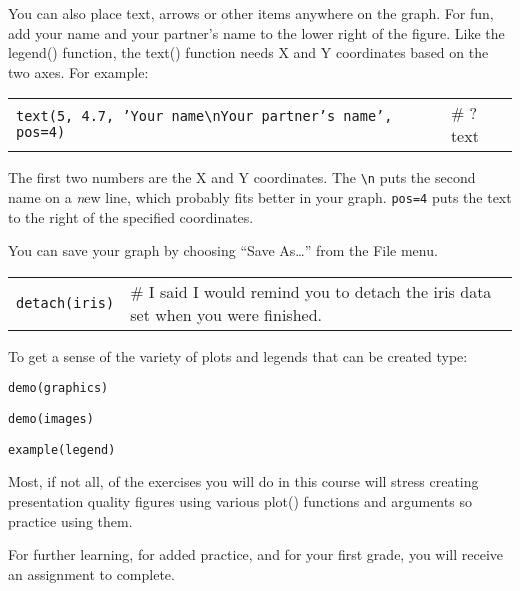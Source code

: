 \documentclass[11pt]{article}
\begin{document}



You can also place text, arrows or other items anywhere on the graph.
For fun, add your name and your partner's name to the lower right of the
figure. Like the legend() function, the text() function needs X and Y
coordinates based on the two axes. For example:

\begin{tabular}{@{}L{4.25in}L{1.5in}@{}}
\texttt{text(5, 4.7, 'Your name\textbackslash{}nYour partner's name', pos=4)} & \# ?text\\

\end{tabular}

The first two numbers are the X and Y coordinates.  The \texttt{\textbackslash{}n} puts the second name on a \emph{n}ew line, which probably fits better in your graph. \texttt{pos=4} puts the text to the right of the specified coordinates.

You can save your graph by choosing ``Save As\ldots{}'' from the File
menu.

\begin{tabular}{@{}L{1in}L{4.5in}@{}}
\texttt{detach(iris)} & \# I said I would remind you to detach the iris data set
when you were finished. \\
\end{tabular}

To get a sense of the variety of plots and legends that can be created
type:

\texttt{demo(graphics)}

\texttt{demo(images)}

\texttt{example(legend)}

Most, if not all, of the exercises you will do in this course will
stress creating presentation quality figures using various plot()
functions and arguments so practice using them.

For further learning, for added practice, and for your first grade, you
will receive an assignment to complete.
\end{document}

